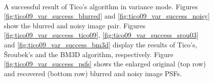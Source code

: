 \documentclass[12pt,notitlepage]{report}
\begin{document}
\begin{figure}[h]
	  ~
	  ~
  \caption[A successful result of Tico's algorithm in variance mode]{A successful result of Tico's algorithm in variance mode. Figures \ref{fig:tico09_var_success_blurred} and \ref{fig:tico09_var_success_noisy} show the blurred and noisy image pair. Figures \ref{fig:tico09_var_success_tico09}, \ref{fig:tico09_var_success_srou03} and \ref{fig:tico09_var_success_bm3d} display the results of Tico's, Šroubek's and the BM3D algorithm, respectively. Figure \ref{fig:tico09_var_success_psfs} shows the enlarged original (top row) and recovered (bottom row) blurred and noisy image PSFs.}
  \label{fig:tico09_var_success}
\end{figure}
	
\clearpage
\end{document}
